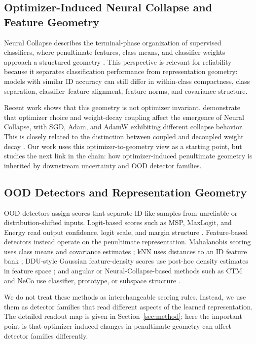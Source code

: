 \subsection{Optimizer-Induced Neural Collapse and Feature Geometry}
\label{subsec:optimizer-geometry}

Neural Collapse describes the terminal-phase organization of supervised
classifiers, where penultimate features, class means, and classifier weights
approach a structured geometry \citep{papyan2020prevalence}. This perspective is
relevant for reliability because it separates classification performance from
representation geometry: models with similar ID accuracy can still differ in
within-class compactness, class separation, classifier--feature alignment,
feature norms, and covariance structure.

Recent work shows that this geometry is not optimizer invariant.
\citet{zhao2026optimizer} demonstrate that optimizer choice and weight-decay
coupling affect the emergence of Neural Collapse, with SGD, Adam, and AdamW
exhibiting different collapse behavior. This is closely related to the
distinction between coupled and decoupled weight decay
\citep{loshchilov2019decoupled}. Our work uses this optimizer-to-geometry view as
a starting point, but studies the next link in the chain: how optimizer-induced
penultimate geometry is inherited by downstream uncertainty and OOD detector
families.

\subsection{OOD Detectors and Representation Geometry}
\label{subsec:ood-detectors-representation-geometry}

OOD detectors assign scores that separate ID-like samples from unreliable or
distribution-shifted inputs. Logit-based scores such as MSP, MaxLogit, and Energy
read output confidence, logit scale, and margin structure
\citep{hendrycks2017baseline,liu2020energy}. Feature-based detectors instead
operate on the penultimate representation. Mahalanobis scoring uses class means
and covariance estimates \citep{lee2018simple}; kNN uses distances to an ID
feature bank \citep{sun2022knn}; DDU-style Gaussian feature-density scores use
post-hoc density estimates in feature space \citep{mukhoti2021ddu}; and angular
or Neural-Collapse-based methods such as CTM and NeCo use classifier, prototype,
or subspace structure \citep{nguyen2023ctm,benammar2023neco}.

We do not treat these methods as interchangeable scoring rules. Instead, we use
them as detector families that read different aspects of the learned
representation. The detailed readout map is given in
Section~\ref{sec:method}; here the important point is that optimizer-induced
changes in penultimate geometry can affect detector families differently.

